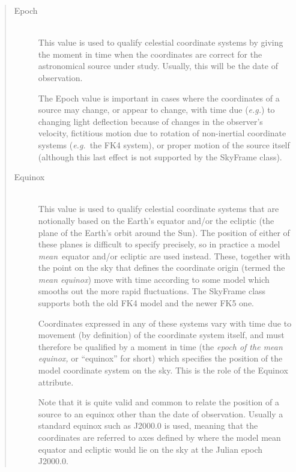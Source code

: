 \documentclass[twoside,11pt]{article}
\newcommand{\htmlref}[2]{#1}
\begin{document}
\begin{quote}
\begin{description}
\item[\htmlref{Epoch}{Epoch}]\mbox{}\\
This value is used to qualify celestial coordinate systems by giving
the moment in time when the coordinates are correct for the
astronomical source under study. Usually, this will be the date of
observation.

The Epoch value is important in cases where the coordinates of a
source may change, or appear to change, with time due ({\em{e.g.}}) to
changing light deflection because of changes in the observer's
velocity, fictitious motion due to rotation of non-inertial coordinate
systems ({\em{e.g.}}\ the FK4 system), or proper motion of the source
itself (although this last effect is not supported by the SkyFrame
class).

\item[\label{ss:equinoxitem}\htmlref{Equinox}{Equinox}]\mbox{}\\
This value is used to qualify celestial coordinate systems that are
notionally based on the Earth's equator and/or the ecliptic (the plane
of the Earth's orbit around the Sun). The position of either of these
planes is difficult to specify precisely, so in practice a model
{\em{mean}}\ equator and/or ecliptic are used instead. These, together
with the point on the sky that defines the coordinate origin (termed
the {\em{mean equinox}}) move with time according to some model which
smooths out the more rapid fluctuations. The SkyFrame class supports
both the old FK4 model and the newer FK5 one.

Coordinates expressed in any of these systems vary with time due to
movement (by definition) of the coordinate system itself, and must
therefore be qualified by a moment in time (the {\em{epoch of the mean
equinox,}} or ``equinox'' for short) which specifies the position of
the model coordinate system on the sky. This is the role of the
Equinox attribute.

Note that it is quite valid and common to relate the position of a
source to an equinox other than the date of observation. Usually a
standard equinox such as J2000.0 is used, meaning that the coordinates
are referred to axes defined by where the model mean equator and
ecliptic would lie on the sky at the Julian epoch J2000.0.
\end{description}
\end{quote}
\end{document}
